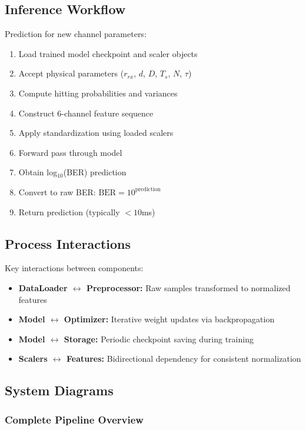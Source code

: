 \documentclass[a4paper,12pt]{report}
\begin{document}
\subsection{Inference Workflow}

Prediction for new channel parameters:
\begin{enumerate}
    \item Load trained model checkpoint and scaler objects
    \item Accept physical parameters ($r_{rx}$, $d$, $D$, $T_s$, $N$, $\tau$)
    \item Compute hitting probabilities and variances
    \item Construct 6-channel feature sequence
    \item Apply standardization using loaded scalers
    \item Forward pass through model
    \item Obtain log$_{10}$(BER) prediction
    \item Convert to raw BER: $\text{BER} = 10^{\text{prediction}}$
    \item Return prediction (typically $< 10$ms)
\end{enumerate}

\subsection{Process Interactions}

Key interactions between components:
\begin{itemize}
    \item \textbf{DataLoader $\leftrightarrow$ Preprocessor:} Raw samples transformed to normalized features
    \item \textbf{Model $\leftrightarrow$ Optimizer:} Iterative weight updates via backpropagation
    \item \textbf{Model $\leftrightarrow$ Storage:} Periodic checkpoint saving during training
    \item \textbf{Scalers $\leftrightarrow$ Features:} Bidirectional dependency for consistent normalization
\end{itemize}

\subsection{System Diagrams}

\subsubsection{Complete Pipeline Overview}
\end{document}
